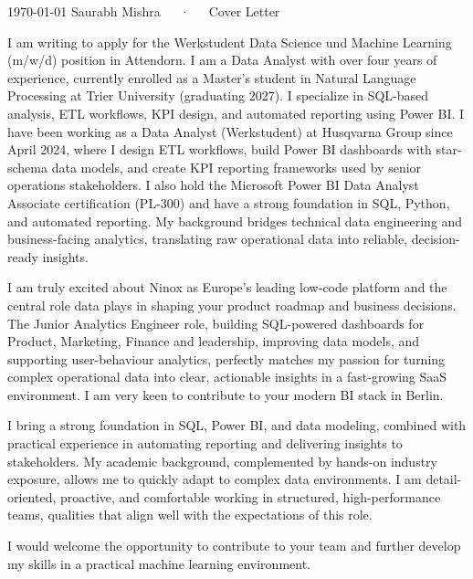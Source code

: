 \documentclass[11pt, a4paper]{awesome-cv}
\begin{document}
\makecvheader[R]
\makecvfooter
  {\today}
  {Saurabh Mishra~~~·~~~Cover Letter}
  {}

\makelettertitle

\begin{cvletter}
I am writing to apply for the Werkstudent Data Science und Machine Learning (m/w/d) position in Attendorn.
I am a Data Analyst with over four years of experience, currently enrolled as a Master's student in Natural Language Processing at Trier University (graduating 2027). I specialize in SQL-based analysis, ETL workflows, KPI design, and automated reporting using Power BI. I have been working as a Data Analyst (Werkstudent) at Husqvarna Group since April 2024, where I design ETL workflows, build Power BI dashboards with star-schema data models, and create KPI reporting frameworks used by senior operations stakeholders. I also hold the Microsoft Power BI Data Analyst Associate certification (PL-300) and have a strong foundation in SQL, Python, and automated reporting. My background bridges technical data engineering and business-facing analytics, translating raw operational data into reliable, decision-ready insights.

I am truly excited about Ninox as Europe’s leading low-code platform and the central role data plays in shaping your product roadmap and business decisions. The Junior Analytics Engineer role, building SQL-powered dashboards for Product, Marketing, Finance and leadership, improving data models, and supporting user-behaviour analytics, perfectly matches my passion for turning complex operational data into clear, actionable insights in a fast-growing SaaS environment. I am very keen to contribute to your modern BI stack in Berlin.

I bring a strong foundation in SQL, Power BI, and data modeling, combined with practical experience in automating reporting and delivering insights to stakeholders. My academic background, complemented by hands-on industry exposure, allows me to quickly adapt to complex data environments. I am detail-oriented, proactive, and comfortable working in structured, high-performance teams, qualities that align well with the expectations of this role.

I would welcome the opportunity to contribute to your team and further develop my skills in a practical machine learning environment.

\end{cvletter}
\makeletterclosing
\end{document}
